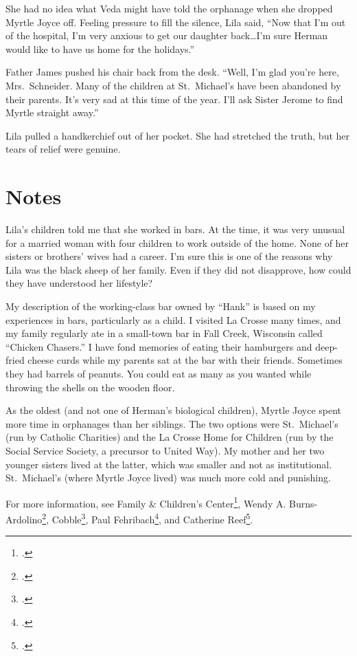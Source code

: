 \documentclass[
  letterpaper,
]{book}
\begin{document}
She had no idea what Veda might have told the orphanage when she dropped
Myrtle Joyce off. Feeling pressure to fill the silence, Lila said, ``Now
that I'm out of the hospital, I'm very anxious to get our daughter
back\ldots I'm sure Herman would like to have us home for the
holidays.''

Father James pushed his chair back from the desk. ``Well, I'm glad
you're here, Mrs.~Schneider. Many of the children at St.~Michael's have
been abandoned by their parents. It's very sad at this time of the year.
I'll ask Sister Jerome to find Myrtle straight away.''

Lila pulled a handkerchief out of her pocket. She had stretched the
truth, but her tears of relief were genuine.

\section{Notes}\label{notes-50}

Lila's children told me that she worked in bars. At the time, it was
very unusual for a married woman with four children to work outside of
the home. None of her sisters or brothers' wives had a career. I'm sure
this is one of the reasons why Lila was the black sheep of her family.
Even if they did not disapprove, how could they have understood her
lifestyle?

My description of the working-class bar owned by ``Hank'' is based on my
experiences in bars, particularly as a child. I visited La Crosse many
times, and my family regularly ate in a small-town bar in Fall Creek,
Wisconsin called ``Chicken Chasers.'' I have fond memories of eating
their hamburgers and deep-fried cheese curds while my parents sat at the
bar with their friends. Sometimes they had barrels of peanuts. You could
eat as many as you wanted while throwing the shells on the wooden floor.

As the oldest (and not one of Herman's biological children), Myrtle
Joyce spent more time in orphanages than her siblings. The two options
were St.~Michael's (run by Catholic Charities) and the La Crosse Home
for Children (run by the Social Service Society, a precursor to United
Way). My mother and her two younger sisters lived at the latter, which
was smaller and not as institutional. St.~Michael's (where Myrtle Joyce
lived) was much more cold and punishing.

For more information, see Family \& Children's Center\footnote{.}, Wendy A.
Burns-Ardolino\footnote{.},
Cobble\footnote{.},
Paul Fehribach\footnote{.}, and Catherine Reef\footnote{.}.
\end{document}
